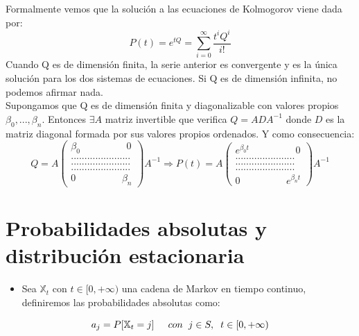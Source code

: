 \documentclass[12pt,a4paper]{article}
\begin{document}
	Formalmente vemos que la solución a las ecuaciones de Kolmogorov viene dada por:
	\begin{equation*}
		P(t) = e^{t Q} = \sum_{i = 0}^{\infty}\frac{t^{i} Q^{i}}{i!}
	\end{equation*} 
	Cuando Q es de dimensión finita, la serie anterior es convergente y es la única solución para los dos sistemas de ecuaciones. Si Q es de dimensión infinita, no podemos afirmar nada.
	\\[0.2cm]
	Supongamos que Q es de dimensión finita y diagonalizable con valores propios $\beta_0 ,..., \beta_n$. Entonces $\exists A$ matriz invertible que verifica $Q = ADA^{-1}$ donde $D$ es la matriz diagonal formada por sus valores propios ordenados. Y como consecuencia:
	\begin{equation*}
		Q = A \begin{pmatrix}
			\beta_0 \hspace{2cm} 0 \\
			......................\\
			......................\\
			......................\\
			0 \hspace{2cm} \beta_n
		\end{pmatrix} A^{-1}
	\Rightarrow
		P(t) = A \begin{pmatrix}
			e^{\beta_0 t} \hspace{2cm} 0 \\
			......................\\
			......................\\
			......................\\
			0 \hspace{2cm} e^{\beta_n t}
		\end{pmatrix} A^{-1}
	\end{equation*}
		\section{Probabilidades absolutas y distribución estacionaria}
	
\begin{itemize}
	\item Sea $\mathbb{X}_{t}$ con $t\in[0,+\infty)$ una cadena de Markov en tiempo continuo,
	definiremos las probabilidades absolutas como:
	\end{itemize}
\begin{equation*}	
	a_{j}=P[\mathbb{X}_{t}=j] \hspace{0.5cm}  con \hspace{0.2cm} j\in{S}, \hspace{0.2cm}  t\in[0,+\infty)
 \end{equation*}
\end{document}
